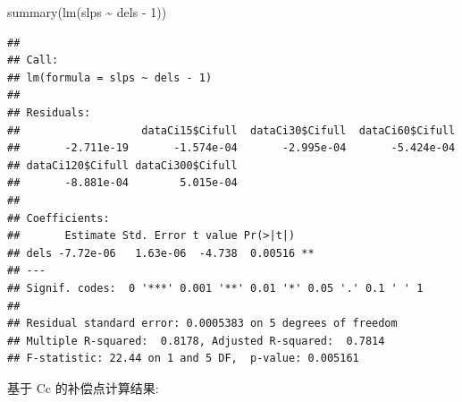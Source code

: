 \documentclass[
]{krantz}
\makeatletter
\newenvironment{Shaded}{\begin{snugshade}}{\end{snugshade}}
\newcommand{\CommentTok}[1]{\textcolor[rgb]{0.56,0.35,0.01}{\textit{#1}}}
\newcommand{\DecValTok}[1]{\textcolor[rgb]{0.00,0.00,0.81}{#1}}
\newcommand{\FunctionTok}[1]{\textcolor[rgb]{0.00,0.00,0.00}{#1}}
\newcommand{\NormalTok}[1]{#1}
\newcommand{\OtherTok}[1]{\textcolor[rgb]{0.56,0.35,0.01}{#1}}
\newcommand{\SpecialCharTok}[1]{\textcolor[rgb]{0.00,0.00,0.00}{#1}}
\newcommand{\StringTok}[1]{\textcolor[rgb]{0.31,0.60,0.02}{#1}}
\newenvironment{kframe}{%
\medskip{}
\setlength{\fboxsep}{.8em}
 \def\at@end@of@kframe{}%
 \ifinner\ifhmode%
  \def\at@end@of@kframe{\end{minipage}}%
  \begin{minipage}{\columnwidth}%
 \fi\fi%
 \def\FrameCommand##1{\hskip\@totalleftmargin \hskip-\fboxsep
 \colorbox{shadecolor}{##1}\hskip-\fboxsep
     \hskip-\linewidth \hskip-\@totalleftmargin \hskip\columnwidth}%
 \MakeFramed {\advance\hsize-\width
   \@totalleftmargin\z@ \linewidth\hsize
   \@setminipage}}%
 {\par\unskip\endMakeFramed%
 \at@end@of@kframe}
\renewenvironment{Shaded}{\begin{kframe}}{\end{kframe}}
\makeatother
\begin{document}
\begin{Shaded}
\begin{Highlighting}[]
\FunctionTok{summary}\NormalTok{(}\FunctionTok{lm}\NormalTok{(slps }\SpecialCharTok{\textasciitilde{}}\NormalTok{ dels }\SpecialCharTok{{-}} \DecValTok{1}\NormalTok{))}
\end{Highlighting}
\end{Shaded}

\begin{verbatim}
## 
## Call:
## lm(formula = slps ~ dels - 1)
## 
## Residuals:
##                   dataCi15$Cifull  dataCi30$Cifull  dataCi60$Cifull 
##       -2.711e-19       -1.574e-04       -2.995e-04       -5.424e-04 
## dataCi120$Cifull dataCi300$Cifull 
##       -8.881e-04        5.015e-04 
## 
## Coefficients:
##       Estimate Std. Error t value Pr(>|t|)   
## dels -7.72e-06   1.63e-06  -4.738  0.00516 **
## ---
## Signif. codes:  0 '***' 0.001 '**' 0.01 '*' 0.05 '.' 0.1 ' ' 1
## 
## Residual standard error: 0.0005383 on 5 degrees of freedom
## Multiple R-squared:  0.8178, Adjusted R-squared:  0.7814 
## F-statistic: 22.44 on 1 and 5 DF,  p-value: 0.005161
\end{verbatim}

基于 Cc 的补偿点计算结果:

\begin{Shaded}
\end{Shaded}
\end{document}
